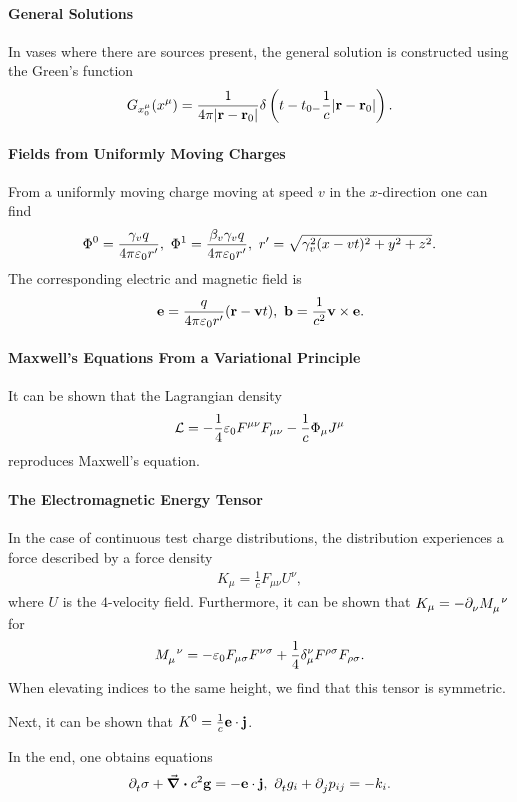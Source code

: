 \paragraph{General Solutions}
In vases where there are sources present, the general solution is constructed using the Green's function
\begin{align*}
	G_{x_{0}^{\mu}}(x^{\mu}) = \frac{1}{4\pi\abs{\vb{r} - \vb{r}_{0}}}\delta\left(t - t_{0 - }\frac{1}{c}\abs{\vb{r} - \vb{r}_{0}}\right).
\end{align*}

\paragraph{Fields from Uniformly Moving Charges}
From a uniformly moving charge moving at speed $v$ in the $x$-direction one can find
\begin{align*}
	\Phi^{0} = \frac{\gamma_{v}q}{4\pi\varepsilon_{0}r^{\prime}},\ \Phi^{1} = \frac{\beta_{v}\gamma_{v}q}{4\pi\varepsilon_{0}r^{\prime}},\ r^{\prime} = \sqrt{\gamma_{v}^{2}(x - vt)^{2} + y^{2} + z^{2}}.
\end{align*}
The corresponding electric and magnetic field is
\begin{align*}
	\vb{e} = \frac{q}{4\pi\varepsilon_{0}r^{\prime}}(\vb{r} - \vb{v}t),\ \vb{b} = \frac{1}{c^{2}}\vb{v}\times\vb{e}.
\end{align*}

\paragraph{Maxwell's Equations From a Variational Principle}
It can be shown that the Lagrangian density
\begin{align*}
	\mathcal{L} = -\frac{1}{4}\varepsilon_{0}F^{\mu\nu}F_{\mu\nu} - \frac{1}{c}\Phi_{\mu}J^{\mu}
\end{align*}
reproduces Maxwell's equation.

\paragraph{The Electromagnetic Energy Tensor}
In the case of continuous test charge distributions, the distribution experiences a force described by a force density
\begin{align*}
	K_{\mu} = \frac{1}{c}F_{\mu\nu}U^{\nu},
\end{align*}
where $U$ is the $4$-velocity field. Furthermore, it can be shown that $K_{\mu} = -\del{\nu}{\tensor{M}{_{\mu}^{\nu}}}$ for
\begin{align*}
	\tensor{M}{_{\mu}^{\nu}} = -\varepsilon_{0}F_{\mu\sigma}F^{\nu\sigma} + \frac{1}{4}\kdelta{\nu}{\mu}F^{\rho\sigma}F_{\rho\sigma}.
\end{align*}
When elevating indices to the same height, we find that this tensor is symmetric.

Next, it can be shown that $K^{0} = \frac{1}{c}\vb{e}\cdot\vb{j}$.

In the end, one obtains equations
\begin{align*}
	\del{t}{\sigma} + \div{c^{2}\vb{g}} = -\vb{e}\cdot\vb{j},\ \del{t}{g_{i}} + \del{j}{p_{ij}} = -k_{i}.
\end{align*}